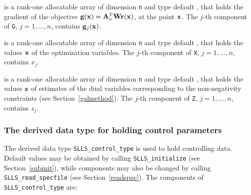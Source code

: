 \documentclass{galahad}
\newcommand{\packagename}{SLLS}
\begin{document}
\begin{description}
 is a rank-one allocatable array of dimension {\tt n} and type
default \realdp, that holds the gradient of the objective
 ${\mathbf{g}}({\mathbf{x}}) = {\mathbf{A}}_o^T {\mathbf{W}} {\mathbf{r}}({\mathbf{x}})$, at the point ${\mathbf{x}}$. 
The $j$-th component of {\tt G}, $j = 1, \ldots, n$, contains ${\mathbf{g}}_{j}({\mathbf{x}})$.

 is a rank-one allocatable array of dimension {\tt n} and type
default \realdp,
that holds the values ${\mathbf{x}}$ of the optimization variables.
The $j$-th component of {\tt X}, $j = 1,  \ldots , n$, contains $x_{j}$.

 is a rank-one allocatable array of dimension {\tt n} and type default
\realdp, that holds
the values ${\mathbf{z}}$ of estimates  of the dual variables
corresponding to the non-negativity constraints (see Section~\ref{galmethod}).
The $j$-th component of {\tt Z}, $j = 1,  \ldots ,  n$, contains $z_{j}$.

\end{description}


\subsubsection{The derived data type for holding control
 parameters}\label{typecontrol}
The derived data type
{\tt \packagename\_control\_type}
is used to hold controlling data. Default values may be obtained by calling
{\tt \packagename\_initialize}
(see Section~\ref{subinit}),
while components may also be changed by calling
{\tt \packagename\_read\-\_specfile}
(see Section~\ref{readspec}).
The components of
{\tt \packagename\_control\_type}
are:
\end{document}
